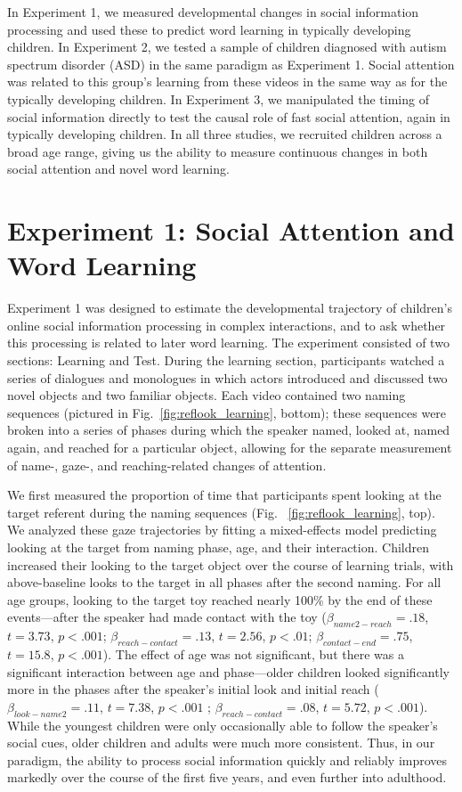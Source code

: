 \documentclass[man,floatsintext]{apa6}
\begin{document}
In Experiment 1, we measured developmental changes in social information processing and used these to predict word learning in typically developing children. In Experiment 2, we tested a sample of children diagnosed with autism spectrum disorder (ASD) in the same paradigm as Experiment 1. Social attention was related to this group’s learning from these videos in the same way as for the typically developing children. In Experiment 3, we manipulated the timing of social information directly to test the causal role of fast social attention, again in typically developing children. In all three studies, we recruited children across a broad age range, giving us the ability to measure continuous changes in both social attention and novel word learning.

\section{Experiment 1: Social Attention and Word Learning}

Experiment 1 was designed to estimate the developmental trajectory of children's online social information processing in complex interactions, and to ask whether this processing is related to later word learning. The experiment consisted of two sections: Learning and Test. During the learning section, participants watched a series of dialogues and monologues in which actors introduced and discussed two novel objects and two familiar objects. Each video contained two naming sequences (pictured in Fig.~\ref{fig:reflook_learning}, bottom); these sequences were broken into a series of phases during which the speaker named, looked at, named again, and reached for a particular object, allowing for the separate measurement of name-, gaze-, and reaching-related changes of attention.

We first measured the proportion of time that participants spent looking at the target referent during the naming sequences (Fig. ~\ref{fig:reflook_learning}, top). We analyzed these gaze trajectories by fitting a mixed-effects model predicting looking at the target from naming phase, age, and their interaction. Children increased their looking to the target object over the course of learning trials, with above-baseline looks to the target in all phases after the second naming. For all age groups, looking to the target toy reached nearly 100\% by the end of these events---after the speaker had made contact with the toy ($\beta_{name2-reach} = .18$, $t = 3.73$, $p < .001$; $\beta_{reach-contact} = .13$, $t = 2.56$, $p < .01$; $\beta_{contact-end} = .75$, $t = 15.8$, $p < .001$). The effect of age was not significant, but there was a significant interaction between age and phase---older children looked significantly more in the phases after the speaker's initial look and initial reach ($\beta_{look-name2} = .11$, $t = 7.38$, $p < .001$ ; $\beta_{reach-contact} = .08$, $t = 5.72$, $p < .001$). While the youngest children were only occasionally able to follow the speaker's social cues, older children and adults were much more consistent. Thus, in our paradigm, the ability to process social information quickly and reliably improves markedly over the course of the first five years, and even further into adulthood.
\end{document}
